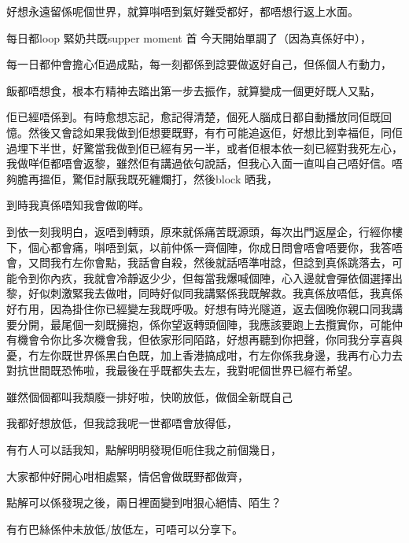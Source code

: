 好想永遠留係呢個世界，就算唞唔到氣好難受都好，都唔想行返上水面。

每日都loop 緊奶共既supper moment 首 今天開始單調了（因為真係好中），

每一日都仲會擔心佢過成點，每一刻都係到諗要做返好自己，但係個人冇動力，

飯都唔想食，根本冇精神去踏出第一步去振作，就算變成一個更好既人又點，

佢已經唔係到。有時愈想忘記，愈記得清楚，個死人腦成日都自動播放同佢既回憶。然後又會諗如果我做到佢想要既野，有冇可能追返佢，好想比到幸福佢，同佢過埋下半世，好驚當我做到佢已經有另一半，或者佢根本依一刻已經對我死左心，我做咩佢都唔會返黎，雖然佢有講過依句說話，但我心入面一直叫自己唔好信。唔夠膽再搵佢，驚佢討厭我既死纏爛打，然後block 晒我，

到時我真係唔知我會做啲咩。

到依一刻我明白，返唔到轉頭，原來就係痛苦既源頭，每次出門返屋企，行經你樓下，個心都會痛，唞唔到氣，以前仲係一齊個陣，你成日問會唔會唔要你，我答唔會，又問我冇左你會點，我話會自殺，然後就話唔準咁諗，但諗到真係跳落去，可能令到你內疚，我就會冷靜返少少，但每當我爆喊個陣，心入邊就會彈依個選擇出黎，好似刺激緊我去做咁，同時好似同我講緊係我既解救。我真係放唔低，我真係好冇用，因為掛住你已經變左我既呼吸。好想有時光隧道，返去個晚你親口同我講要分開，最尾個一刻既擁抱，係你望返轉頭個陣，我應該要跑上去攬實你，可能仲有機會令你比多次機會我，但依家形同陌路，好想再聽到你把聲，你同我分享喜與憂，冇左你既世界係黑白色既，加上香港搞成咁，冇左你係我身邊，我再冇心力去對抗世間既恐怖啦，我最後在乎既都失去左，我對呢個世界已經冇希望。

雖然個個都叫我頹廢一排好啦，快啲放低，做個全新既自己

我都好想放低，但我諗我呢一世都唔會放得低，

有冇人可以話我知，點解明明發現佢呃住我之前個幾日，

大家都仲好開心咁相處緊，情侶會做既野都做齊，

點解可以係發現之後，兩日裡面變到咁狠心絕情、陌生？

有冇巴絲係仲未放低/放低左，可唔可以分享下。

